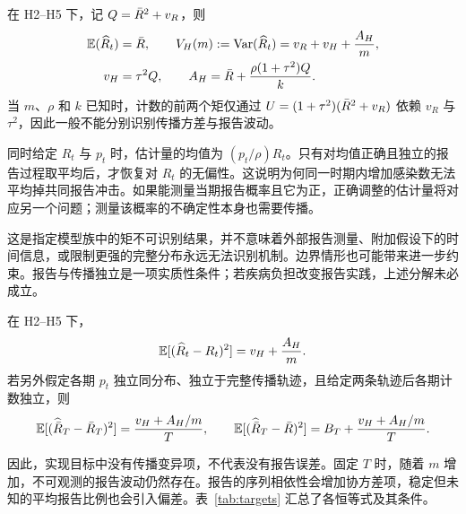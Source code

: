\begin{proposition}[报告波动与矩不可识别性]
\label{prop:report-noise}
在 H2--H5 下，记 $Q=\bar R^2+v_R$，则
\begin{equation}
\begin{aligned}
  \mathbb{E}(\widehat R_t)&=\bar R,\qquad
  V_H(m):=\mathrm{Var}(\widehat R_t)=v_R+v_H+\frac{A_H}{m},\\
  v_H&=\tau^2Q,\qquad
  A_H=\bar R+\frac{\rho(1+\tau^2)Q}{k}.
\end{aligned}
  \label{eq:vH-AH}
\end{equation}
当 $m$、$\rho$ 和 $k$ 已知时，计数的前两个矩仅通过 $U=(1+\tau^2)(\bar R^2+v_R)$ 依赖 $v_R$ 与 $\tau^2$，因此一般不能分别识别传播方差与报告波动。
\end{proposition}

同时给定 $R_t$ 与 $p_t$ 时，估计量的均值为 $(p_t/\rho)R_t$。只有对均值正确且独立的报告过程取平均后，才恢复对 $R_t$ 的无偏性。这说明为何同一时期内增加感染数无法平均掉共同报告冲击。如果能测量当期报告概率且它为正，正确调整的估计量将对应另一个问题；测量该概率的不确定性本身也需要传播。

这是指定模型族中的矩不可识别结果，并不意味着外部报告测量、附加假设下的时间信息，或限制更强的完整分布永远无法识别机制。边界情形也可能带来进一步约束。报告与传播独立是一项实质性条件；若疾病负担改变报告实践，上述分解未必成立。

\begin{corollary}[报告波动下的当期值与实现均值风险]
\label{cor:report-current}
在 H2--H5 下，
\begin{equation}
  \mathbb{E}[(\widehat R_t-R_t)^2]=v_H+\frac{A_H}{m}.
  \label{eq:vH-current}
\end{equation}
若另外假定各期 $p_t$ 独立同分布、独立于完整传播轨迹，且给定两条轨迹后各期计数独立，则
\begin{equation}
  \mathbb{E}[(\widehat{\bar R}_T-\bar R_T)^2]=\frac{v_H+A_H/m}{T},\qquad
  \mathbb{E}[(\widehat{\bar R}_T-\bar R)^2]=B_T+\frac{v_H+A_H/m}{T}.
  \label{eq:report-means}
\end{equation}
\end{corollary}

因此，实现目标中没有传播变异项，不代表没有报告误差。固定 $T$ 时，随着 $m$ 增加，不可观测的报告波动仍然存在。报告的序列相依性会增加协方差项，稳定但未知的平均报告比例也会引入偏差。表~\ref{tab:targets} 汇总了各恒等式及其条件。

